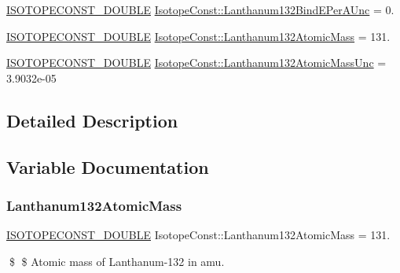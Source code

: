 \begin{DoxyCompactItemize}
\mbox{\hyperlink{group___isotope_const-_macros_ga8f45a7272ce02c0b4c65c44636ed719a}{I\+S\+O\+T\+O\+P\+E\+C\+O\+N\+S\+T\+\_\+\+D\+O\+U\+B\+LE}} \mbox{\hyperlink{group___isotope_const-_lanthanum-_la132_gab7ef520382ab826faf3b5ed86a4368ad}{Isotope\+Const\+::\+Lanthanum132\+Bind\+E\+Per\+A\+Unc}} = 0.
\item 
\mbox{\hyperlink{group___isotope_const-_macros_ga8f45a7272ce02c0b4c65c44636ed719a}{I\+S\+O\+T\+O\+P\+E\+C\+O\+N\+S\+T\+\_\+\+D\+O\+U\+B\+LE}} \mbox{\hyperlink{group___isotope_const-_lanthanum-_la132_gadb4d94043cdc72b23eb3416f48652cab}{Isotope\+Const\+::\+Lanthanum132\+Atomic\+Mass}} = 131.
\item 
\mbox{\hyperlink{group___isotope_const-_macros_ga8f45a7272ce02c0b4c65c44636ed719a}{I\+S\+O\+T\+O\+P\+E\+C\+O\+N\+S\+T\+\_\+\+D\+O\+U\+B\+LE}} \mbox{\hyperlink{group___isotope_const-_lanthanum-_la132_gae738a70144158ba610d132f0bb1db1d8}{Isotope\+Const\+::\+Lanthanum132\+Atomic\+Mass\+Unc}} = 3.\+9032e-\/05
\end{DoxyCompactItemize}


\subsection{Detailed Description}


\subsection{Variable Documentation}
\mbox{\label{group___isotope_const-_lanthanum-_la132_gadb4d94043cdc72b23eb3416f48652cab}} 
\subsubsection{\texorpdfstring{Lanthanum132\+Atomic\+Mass}{Lanthanum132AtomicMass}}
{\footnotesize\ttfamily \mbox{\hyperlink{group___isotope_const-_macros_ga8f45a7272ce02c0b4c65c44636ed719a}{I\+S\+O\+T\+O\+P\+E\+C\+O\+N\+S\+T\+\_\+\+D\+O\+U\+B\+LE}} Isotope\+Const\+::\+Lanthanum132\+Atomic\+Mass = 131.}

\$ \$ Atomic mass of Lanthanum-\/132 in amu. \mbox{\label{group___isotope_const-_lanthanum-_la132_gae738a70144158ba610d132f0bb1db1d8}} 
